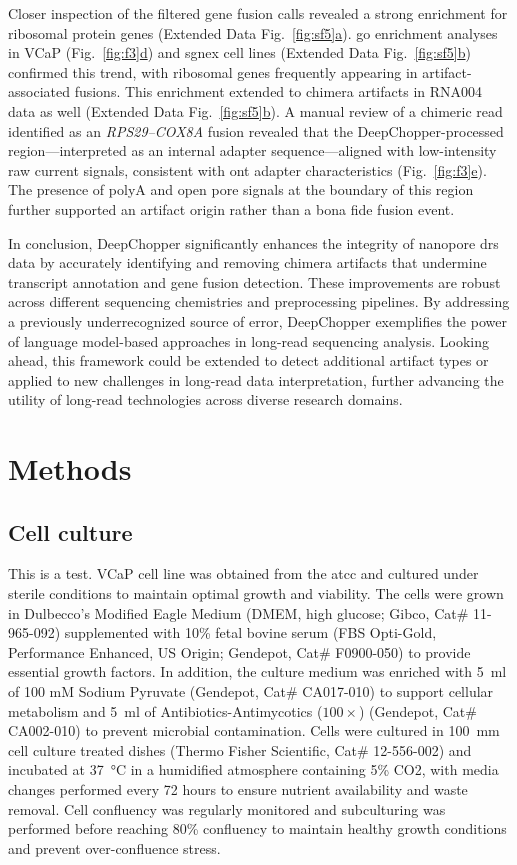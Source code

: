 \documentclass[pdflatex,sn-nature, lineno]{sn-jnl}%
\newcommand{\figref}[2]{Fig.~\hyperref[#1]{\ref*{#1}#2}}
\newcommand{\edfigref}[2]{Extended Data Fig.~\hyperref[#1]{\ref*{#1}#2}}
\begin{document}
Closer inspection of the filtered gene fusion calls revealed a strong enrichment for ribosomal protein genes (\edfigref{fig:sf5}{a}). \gls{go} enrichment analyses in VCaP (\figref{fig:f3}{d}) and \gls{sgnex} cell lines (\edfigref{fig:sf5}{b}) confirmed this trend, with ribosomal genes frequently appearing in artifact-associated fusions. This enrichment extended to chimera artifacts in RNA004 data as well (\edfigref{fig:sf5}{b}). A manual review of a chimeric read identified as an \textit{RPS29–COX8A} fusion revealed that the DeepChopper-processed region—interpreted as an internal adapter sequence—aligned with low-intensity raw current signals, consistent with \gls{ont} adapter characteristics (\figref{fig:f3}{e}). The presence of polyA and open pore signals at the boundary of this region further supported an artifact origin rather than a bona fide fusion event.

In conclusion, DeepChopper significantly enhances the integrity of nanopore \gls{drs} data by accurately identifying and removing chimera artifacts that undermine transcript annotation and gene fusion detection. These improvements are robust across different sequencing chemistries and preprocessing pipelines. By addressing a previously underrecognized source of error, DeepChopper exemplifies the power of language model-based approaches in long-read sequencing analysis. Looking ahead, this framework could be extended to detect additional artifact types or applied to new challenges in long-read data interpretation, further advancing the utility of long-read technologies across diverse research domains.

\section{Methods}\label{sec:methods}


\subsection{Cell culture}

This is a test. VCaP cell line was obtained from the \gls{atcc} and cultured under sterile conditions to maintain optimal growth and viability.
The cells were grown in Dulbecco's Modified Eagle Medium (DMEM, high glucose; Gibco, Cat\# 11-965-092) supplemented with 10\% fetal bovine serum (FBS Opti-Gold, Performance Enhanced, US Origin; Gendepot, Cat\# F0900-050) to provide essential growth factors.
In addition, the culture medium was enriched with \SI{5}{\ml} of 100 mM Sodium Pyruvate (Gendepot, Cat\# CA017-010) to support cellular metabolism and \SI{5}{\ml} of Antibiotics-Antimycotics (\( 100\times \)) (Gendepot, Cat\# CA002-010) to prevent microbial contamination.
Cells were cultured in \SI{100}{\mm} cell culture treated dishes (Thermo Fisher Scientific, Cat\# 12-556-002) and incubated at \SI{37}{\degreeCelsius} in a humidified atmosphere containing 5\% CO2, with media changes performed every 72 hours to ensure nutrient availability and waste removal.
Cell confluency was regularly monitored and subculturing was performed before reaching 80\% confluency to maintain healthy growth conditions and prevent over-confluence stress.
\end{document}
